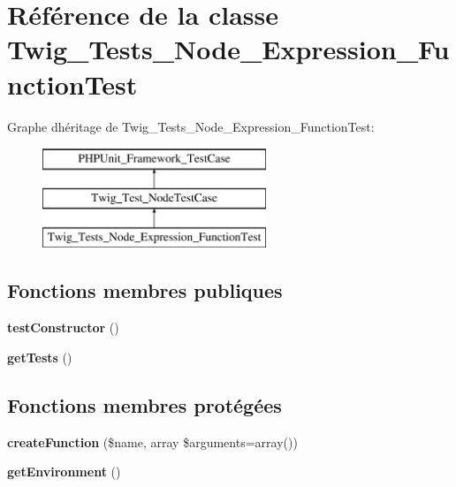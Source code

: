 \hypertarget{class_twig___tests___node___expression___function_test}{}\section{Référence de la classe Twig\+\_\+\+Tests\+\_\+\+Node\+\_\+\+Expression\+\_\+\+Function\+Test}
\label{class_twig___tests___node___expression___function_test}
Graphe d\textquotesingle{}héritage de Twig\+\_\+\+Tests\+\_\+\+Node\+\_\+\+Expression\+\_\+\+Function\+Test\+:\begin{figure}[H]
\begin{center}
\leavevmode
\includegraphics[height=3.000000cm]{class_twig___tests___node___expression___function_test}
\end{center}
\end{figure}
\subsection*{Fonctions membres publiques}
\begin{DoxyCompactItemize}
\item 
{\bfseries test\+Constructor} ()\hypertarget{class_twig___tests___node___expression___function_test_a47094dc941e72950570900d1418f89c6}{}\label{class_twig___tests___node___expression___function_test_a47094dc941e72950570900d1418f89c6}

\item 
{\bfseries get\+Tests} ()\hypertarget{class_twig___tests___node___expression___function_test_a7e247dd31cc8d37a6c97353a062a0080}{}\label{class_twig___tests___node___expression___function_test_a7e247dd31cc8d37a6c97353a062a0080}

\end{DoxyCompactItemize}
\subsection*{Fonctions membres protégées}
\begin{DoxyCompactItemize}
\item 
{\bfseries create\+Function} (\$name, array \$arguments=array())\hypertarget{class_twig___tests___node___expression___function_test_a93d956138b3f4d794eec77269c6b7d32}{}\label{class_twig___tests___node___expression___function_test_a93d956138b3f4d794eec77269c6b7d32}

\item 
{\bfseries get\+Environment} ()\hypertarget{class_twig___tests___node___expression___function_test_a1a945689f9a90f9029d671ec32262d37}{}\label{class_twig___tests___node___expression___function_test_a1a945689f9a90f9029d671ec32262d37}

\end{DoxyCompactItemize}


